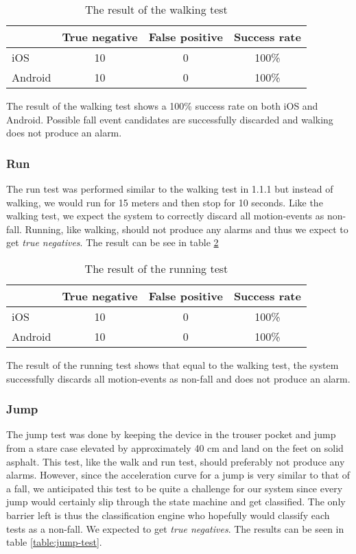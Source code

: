 \documentclass[12pt, a4paper, onecolumn]{article}
\begin{document}
			\begin{table}[H]
				\centering
				\begin{tabular}{|l|c|c|c|}
					\hline
					& True negative & False positive & Success rate \\ \hline
					iOS     & 10            & 0              & 100\%        \\ \hline
					Android & 10            & 0              & 100\%        \\ \hline
				\end{tabular}
					\caption{The result of the walking test}
					\label{table:walk-test}
			\end{table}
		
		The result of the walking test shows a 100\% success rate on both iOS and Android. Possible fall event candidates are successfully discarded and walking does not produce an alarm.
		
		
		\subsubsection{Run}
		The run test was performed similar to the walking test in 1.1.1 but instead of walking, we would run for 15 meters and then stop for 10 seconds. Like the walking test, we expect the system to correctly discard all motion-events as non-fall. Running, like walking, should not produce any alarms and thus we expect to get \textit{true negatives}. The result can be see in table \ref{table:run-test}
		
		
		\begin{table}[H]
			\centering
			\begin{tabular}{|l|c|c|c|}
				\hline
				& True negative & False positive & Success rate \\ \hline
				iOS     & 10            & 0              & 100\%        \\ \hline
				Android & 10            & 0              & 100\%        \\ \hline
			\end{tabular}
			\caption{The result of the running test}
			\label{table:run-test}
		\end{table}
		
		The result of the running test shows that equal to the walking test, the system successfully discards all motion-events as non-fall and does not produce an alarm.
		
		
		\subsubsection{Jump}
		The jump test was done by keeping the device in the trouser pocket and jump from a stare case elevated by approximately 40 cm and land on the feet on solid asphalt. This test, like the walk and run test, should preferably not produce any alarms. However, since the acceleration curve for a jump is very similar to that of a fall, we anticipated this test to be quite a challenge for our system since every jump would certainly slip through the state machine and get classified. The only barrier left is thus the classification engine who hopefully would classify each tests as a non-fall. We expected to get \textit{true negatives}. The results can be seen in table \ref{table:jump-test}.
		
\end{document}

